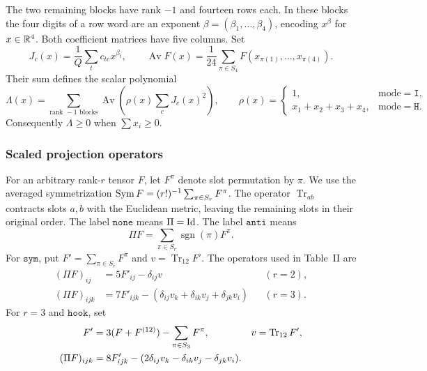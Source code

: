 The two remaining blocks have rank $-1$ and fourteen rows each.  In these
blocks the four digits of a row word are an exponent
$\beta=(\beta_1,\ldots,\beta_4)$, encoding $x^\beta$ for $x\in\mathbb R^4$.
Both coefficient matrices have five columns.  Set
\[
 J_c(x)=\frac1Q\sum_t c_{tc}x^{\beta_t},\qquad
 \operatorname{Av}F(x)=\frac1{24}\sum_{\pi\in S_4}
                  F(x_{\pi(1)},\ldots,x_{\pi(4)}).
\]
Their sum defines the scalar polynomial
\begin{equation}\label{cert:boundary-gram}
 \Lambda(x)=\sum_{\text{rank }-1\text{ blocks}}
            \operatorname{Av}\left(\rho(x)\sum_c J_c(x)^2\right),
 \qquad
 \rho(x)=\begin{cases}1,&\mathrm{mode}=\texttt{I},\\
             x_1+x_2+x_3+x_4,&\mathrm{mode}=\texttt{H}.
             \end{cases}
\end{equation}
Consequently $\Lambda\ge0$ when $\sum x_i\ge0$.

\subsubsection{Scaled projection operators}\label{cert:projections}

For an arbitrary rank-$r$ tensor $F$, let $F^\pi$ denote slot permutation
by $\pi$.  We use the averaged symmetrization
$\operatorname{Sym} F=(r!)^{-1}\sum_{\pi\in S_r}F^\pi$.
The operator $\operatorname{Tr}_{ab}$ contracts slots $a,b$ with the
Euclidean metric, leaving the remaining slots in their original order.
The label $\texttt{none}$ means $\Pi=\operatorname{Id}$.  The label
$\texttt{anti}$ means
\[
 \Pi F=\sum_{\pi\in S_r}\operatorname{sgn}(\pi)F^\pi.
\]
For $\texttt{sym}$, put $F'=\sum_{\pi\in S_r}F^\pi$ and
$v=\operatorname{Tr}_{12}F'$.  The operators used in Table~II are
\begin{align}
 (\Pi F)_{ij}&=5F'_{ij}-\delta_{ij}v &&(r=2),\label{cert:sym2}\\
 (\Pi F)_{ijk}&=7F'_{ijk}
       -(\delta_{ij}v_k+\delta_{ik}v_j+\delta_{jk}v_i) &&(r=3).
       \label{cert:sym3}
\end{align}
For $r=3$ and $\texttt{hook}$, set
\begin{align}
 F'&=3(F+F^{(12)})-\sum_{\pi\in S_3}F^\pi,
       &v&=\operatorname{Tr}_{12}F',\notag\\
 (\Pi F)_{ijk}&=8F'_{ijk}
       -(2\delta_{ij}v_k-\delta_{ik}v_j-\delta_{jk}v_i).
       \label{cert:hook}
\end{align}

